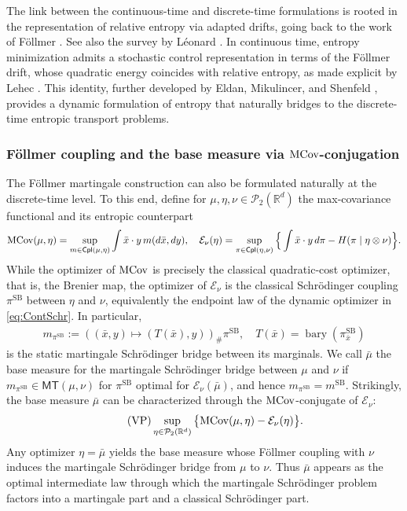 \documentclass[reqno, a4paper]{amsart}
\newcommand{\msb}{m^{\text{SB}}}
\newcommand{\psb}{\pi^{\text{SB}}}
\theoremstyle{plain}
\theoremstyle{definition}
\theoremstyle{remark}
\numberwithin{equation}{section}
\numberwithin{theorem}{section}
\newcommand{\R}{\mathbb{R}}
\newcommand{\MT}{\mathsf{MT}}
\newcommand{\Cpl}{\mathsf{Cpl}}
\newcommand{\bary}{\operatorname{bary}}
\newcommand{\MCov}{\textnormal{MCov}}
\newcommand{\PP}{\mathcal{P}}
\begin{document}
	The link between the continuous-time and discrete-time formulations is rooted in the representation of relative entropy via adapted drifts, going back to the work of Föllmer \cite{Fo85,Fo86}. See also the survey by L{\'e}onard \cite{Le14}. In continuous time, entropy minimization admits a stochastic control representation in terms of the Föllmer drift, whose quadratic energy coincides with relative entropy, as made explicit by Lehec \cite{Le13}. This identity, further developed by Eldan, Mikulincer, and Shenfeld \cite{ElMi20,ElLeSh20}, provides a dynamic formulation of entropy that naturally bridges to the discrete-time entropic transport problems.
	
	
	\subsubsection{F\"ollmer coupling and the base measure via \(\MCov\)-conjugation}
	
	The Föllmer martingale construction can also be formulated naturally at the discrete-time level.
	To this end, define for \(\mu,\eta,\nu\in\PP_2(\R^d)\) the max-covariance functional and its entropic counterpart
	\begin{align}\label{eq:McovsIntro}
		\MCov(\mu,\eta)=\sup_{m\in\Cpl(\mu,\eta)} \int \bar x\cdot y\,m(d\bar x, dy), \quad  \mathcal E_\nu(\eta)
		=
		\sup_{\pi\in\Cpl(\eta,\nu)}
		\Big\{\int \bar x\cdot y\,d\pi-H(\pi\mid \eta\otimes \nu)\Big\}.
	\end{align}
	While the optimizer of \(\MCov\) is precisely the classical quadratic-cost optimizer, that is, the Brenier map, the optimizer of \(\mathcal E_\nu\) is the classical Schr\"odinger coupling \(\psb\) between \(\eta\) and \(\nu\), equivalently the endpoint law of the dynamic optimizer in \eqref{eq:ContSchr}.
	In particular,
	\begin{align*}
		m_{\psb} := ((\bar x,y)\mapsto (T(\bar x), y))_{\# }\psb, \quad  T(\bar x)=\bary(\psb_{\bar x})
	\end{align*}
	is the static martingale Schrödinger bridge between its marginals.
	We call \(\bar\mu\) the base measure for the martingale Schrödinger bridge between \(\mu\) and \(\nu\) if \(m_{\psb} \in \MT(\mu,\nu)\) for $\psb$ optimal for $\mathcal E_{\nu}(\bar\mu)$, and hence \(m_{\psb}=\msb\).
	Strikingly, the base measure \(\bar\mu\) can be characterized  through the \(\MCov\)-conjugate of \(\mathcal E_\nu\):
	\begin{align}\label{eq:vp}\tag{VP}
		\sup_{\eta\in\PP_2(\R^d)} \big\{\MCov(\mu,\eta)-\mathcal E_\nu(\eta)\big\}.
	\end{align}
	Any optimizer \(\eta=\bar\mu\) yields the base measure whose F\"ollmer coupling with \(\nu\) induces the martingale Schr\"odinger bridge from \(\mu\) to \(\nu\).
	Thus \(\bar\mu\) appears as the optimal intermediate law through which the martingale Schr\"odinger problem factors into a martingale part and a classical Schr\"odinger part.
	
\end{document}
